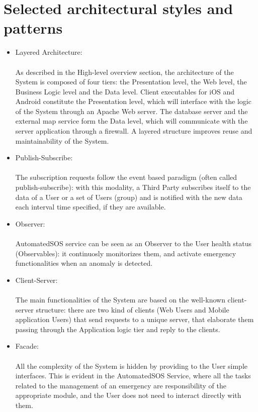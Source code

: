 \section{Selected architectural styles and patterns}

\begin{itemize}
    \item Layered Architecture:\\ \\
    As described in the High-level overview section, the architecture of the System is composed of four tiers: the Presentation level, the Web level, the Business Logic level and the Data level. Client executables for iOS and Android constitute the Presentation level, which will interface with the logic of the System through an Apache Web server. The database server and the external map service form the Data level, which will communicate with the server application through a firewall. A layered structure improves reuse and maintainability of the System.
    \item Publish-Subscribe: \\ \\
    The subscription requests follow the event based paradigm (often called publish-subscribe): with this modality, a Third Party subscribes itself to the data of a User or a set of Users (group) and is notified with the new data each interval time specified, if they are available.
    \item Observer: \\ \\
    AutomatedSOS service can be seen as an Observer to the User health status (Observables): it continuosly monitorizes them, and activate emergency functionalities when an anomaly is detected.
    \item Client-Server: \\ \\
    The main functionalities of the System are based on the well-known client-server structure: there are two kind of clients (Web Users and Mobile application Users) that send requests to a unique server, that elaborate them passing through the Application logic tier and reply to the clients.
    \item Facade: \\ \\
    All the complexity of the System is hidden by providing to the User simple interfaces. This is evident in the AutomatedSOS Service, where all the tasks related to the management of an emergency are responsibility of the appropriate module, and the User does not need to interact directly with them.
\end{itemize}